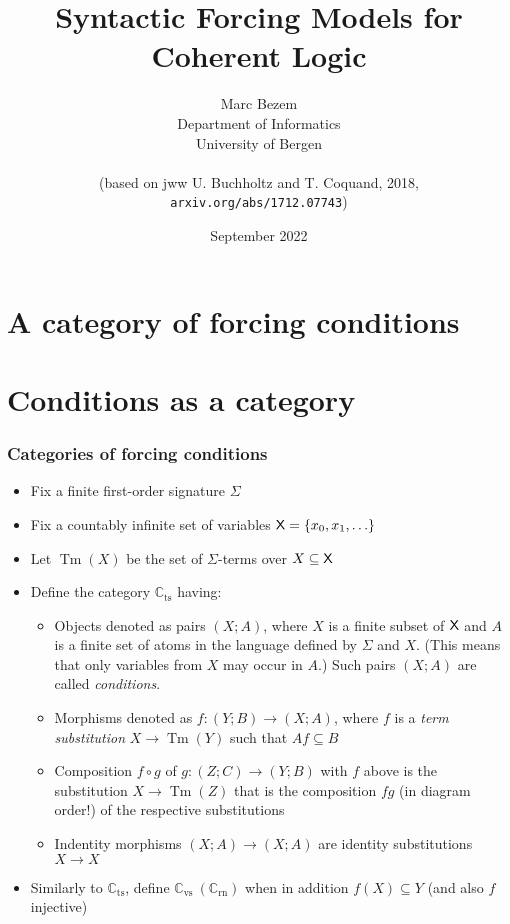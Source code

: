 \documentclass[handout,11pt]{beamer}
\title{Syntactic Forcing Models for Coherent Logic}
\author{Marc Bezem\\
Department of Informatics\\
University of Bergen\\
\mbox{ }\\
(based on jww U. Buchholtz and T. Coquand, 2018,\\
{\tt arxiv.org/abs/1712.07743})
}
\date{September 2022}
\newcommand{\set}[1]{\{#1\}}
\newcommand{\XX}{\mbox{\sf X}}
\newcommand*{\subvs}{_{\mathrm{vs}}}
\newcommand*{\subrn}{_{\mathrm{rn}}}
\newcommand*{\subts}{_{\mathrm{ts}}}
\newcommand{\Cvs}{\mathbb{C}\subvs}
\newcommand{\Crn}{\mathbb{C}\subrn}
\newcommand{\Cts}{\mathbb{C}\subts}
\DeclareMathOperator{\Tm}{Tm}
\begin{document}
\frame{\titlepage}

\section[Outline]{}
\frame{\tableofcontents}


\section{A category of forcing conditions}

\section{Conditions as a category}

\begin{frame}
\frametitle{Categories of forcing conditions}
 \begin{itemize}[<+->]   %
   \item Fix a finite first-order signature $\Sigma$
   \item Fix a countably infinite set of variables $\XX=\set{x_0,x_1,\ldots}$
   \item Let $\Tm(X)$ be the set of $\Sigma$-terms over $X \subseteq \XX$    
   \item Define the category $\Cts$ having:
    \begin{itemize}[<+->]   %
    \item Objects denoted as pairs $(X;A)$,
    where $X$ is a finite subset of $\XX$ and $A$ is a finite set
    of atoms in the language defined by $\Sigma$ and $X$.
    (This means that only variables from $X$ may occur in $A$.)
    Such pairs $(X;A)$ are called \emph{conditions}.
    \item Morphisms denoted as $f : (Y;B) \to (X;A)$, where $f$ is a 
    \emph{term substitution} $X \to \Tm(Y)$ such that $Af \subseteq B$
    \item Composition $f\circ g$ of $g : (Z;C) \to (Y;B)$ with $f$ above is
    the substitution $X \to \Tm(Z)$ that is the composition $fg$
    (in diagram order!) of the respective substitutions
    \item Indentity morphisms $(X;A)\to(X;A)$ are identity 
    substitutions $X\to X$
    \end{itemize}
    \item Similarly to $\Cts$, define $\Cvs~(\Crn)$ when 
    in addition $f(X)\subseteq Y$ (and also $f$ injective)
 \end{itemize}
\end{frame}
\end{document}
